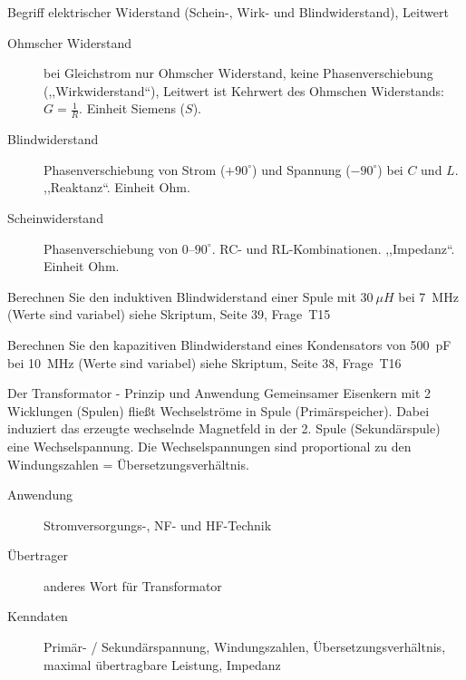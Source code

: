 \documentclass[avery5371,grid,frame,a4paper]{flashcards}
\newcommand{\card}[3]{
  \begin{flashcard}[{\chap} -- #1]{#2}#3\end{flashcard}
}
\begin{document}
\card{14}{Begriff elektrischer Widerstand (Schein-, Wirk- und Blindwiderstand), Leitwert}{
  \small
  \begin{description}
    \item[Ohmscher Widerstand] bei Gleichstrom nur Ohmscher Widerstand,
      keine Phasenverschiebung (,,Wirkwiderstand``),
      Leitwert ist Kehrwert des Ohmschen Widerstands: $G = \frac1{R}$. Einheit Siemens ($S$).
    \item[Blindwiderstand]
      Phasenverschiebung von Strom ($+90^\circ$) und Spannung ($-90^\circ$) bei $C$ und $L$.
      ,,Reaktanz``. Einheit Ohm.
    \item[Scheinwiderstand]
      Phasenverschiebung von 0--$90^\circ$. RC- und RL-Kombinationen. ,,Impedanz``. Einheit Ohm.
  \end{description}
}

\card{15}{Berechnen Sie den induktiven Blindwiderstand einer Spule mit $30~\mu H$ bei 7~MHz (Werte sind variabel)}{
  \centering
  siehe Skriptum, Seite 39, Frage~T15
}

\card{16}{Berechnen Sie den kapazitiven Blindwiderstand eines Kondensators von 500~pF bei \SI{10}{\mega\Hz} (Werte sind variabel)}{
  \centering
  siehe Skriptum, Seite 38, Frage~T16
}

\card{17}{Der Transformator - Prinzip und Anwendung}{
  \footnotesize
  Gemeinsamer Eisenkern mit 2 Wicklungen (Spulen) fließt Wechselströme in Spule (Primärspeicher).
  Dabei induziert das erzeugte wechselnde Magnetfeld in der 2. Spule (Sekundärspule)
  eine Wechselspannung. Die Wechselspannungen sind proportional zu den Windungszahlen
  = Übersetzungsverhältnis.
  \begin{description}
    \item[Anwendung] Stromversorgungs-, NF- und HF-Technik
    \item[Übertrager] anderes Wort für Transformator
    \item[Kenndaten]
      Primär- / Sekundärspannung, Windungszahlen, Übersetzungsverhältnis,
      maximal übertragbare Leistung, Impedanz
  \end{description}
}
\end{document}
